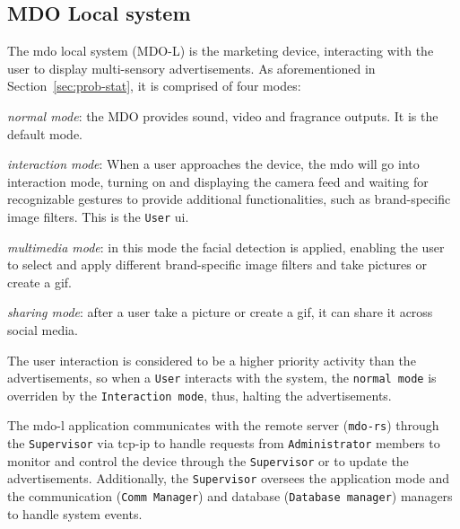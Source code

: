 \subsection{MDO Local system}
\label{sec:mdo-local-system}
The \gls{mdo} local system (MDO-L) is the marketing device, interacting with the user
to display multi-sensory advertisements. As aforementioned in
Section~\ref{sec:prob-stat}, it is comprised of four modes:
\begin{item-c}
\item \emph{normal mode}: the MDO provides sound, video and fragrance
  outputs. It is the default mode.
\item \emph{interaction mode}: When a user approaches the device, the \gls{mdo} will
go into interaction mode, turning on and displaying the camera feed and waiting
for recognizable gestures to provide additional functionalities, such as
brand-specific image filters. This is the \texttt{User} \gls{ui}.
\item \emph{multimedia mode}: in this mode the facial detection is applied,
  enabling the user to select and apply different brand-specific image filters and take pictures or create a \gls{gif}.
\item \emph{sharing mode}: after a user take a picture or create a \gls{gif}, it
  can share it across social media.
\end{item-c}

The user interaction is considered to be a higher priority activity than the
advertisements, so when a \texttt{User} interacts with the system, the \texttt{normal
mode} is overriden by the \texttt{Interaction mode}, thus, halting the
advertisements.

The \gls{mdo-l} application communicates with the remote server
(\texttt{\gls{mdo-rs}}) through the \texttt{Supervisor} via \gls{tcp-ip}
 to handle requests from \texttt{Administrator} members
to monitor and control the device through the \texttt{Supervisor} or to update
the advertisements. Additionally, the \texttt{Supervisor} oversees the
application mode and the communication (\texttt{Comm Manager}) and database
(\texttt{Database manager}) managers to handle system events.
%
